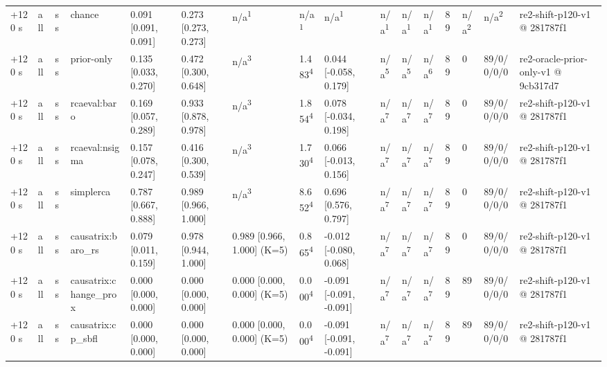\begin{table}[t]
\begin{tabular}{llllllllllllllll}
+120 s & all & ss & chance & 0.091 [0.091, 0.091] & 0.273 [0.273, 0.273] & n/a\textsuperscript{1} & n/a\textsuperscript{1} & n/a\textsuperscript{1} & n/a\textsuperscript{1} & n/a\textsuperscript{1} & n/a\textsuperscript{1} & 89 & n/a\textsuperscript{2} & n/a\textsuperscript{2} & re2-shift-p120-v1 @ 281787f1 \\
+120 s & all & ss & prior-only & 0.135 [0.033, 0.270] & 0.472 [0.300, 0.648] & n/a\textsuperscript{3} & 1.483\textsuperscript{4} & 0.044 [-0.058, 0.179] & n/a\textsuperscript{5} & n/a\textsuperscript{5} & n/a\textsuperscript{6} & 89 & 0 & 89/0/0/0/0 & re2-oracle-prior-only-v1 @ 9cb317d7 \\
+120 s & all & ss & rcaeval:baro & 0.169 [0.057, 0.289] & 0.933 [0.878, 0.978] & n/a\textsuperscript{3} & 1.854\textsuperscript{4} & 0.078 [-0.034, 0.198] & n/a\textsuperscript{7} & n/a\textsuperscript{7} & n/a\textsuperscript{7} & 89 & 0 & 89/0/0/0/0 & re2-shift-p120-v1 @ 281787f1 \\
+120 s & all & ss & rcaeval:nsigma & 0.157 [0.078, 0.247] & 0.416 [0.300, 0.539] & n/a\textsuperscript{3} & 1.730\textsuperscript{4} & 0.066 [-0.013, 0.156] & n/a\textsuperscript{7} & n/a\textsuperscript{7} & n/a\textsuperscript{7} & 89 & 0 & 89/0/0/0/0 & re2-shift-p120-v1 @ 281787f1 \\
+120 s & all & ss & simplerca & 0.787 [0.667, 0.888] & 0.989 [0.966, 1.000] & n/a\textsuperscript{3} & 8.652\textsuperscript{4} & 0.696 [0.576, 0.797] & n/a\textsuperscript{7} & n/a\textsuperscript{7} & n/a\textsuperscript{7} & 89 & 0 & 89/0/0/0/0 & re2-shift-p120-v1 @ 281787f1 \\
+120 s & all & ss & causatrix:baro\_rs & 0.079 [0.011, 0.159] & 0.978 [0.944, 1.000] & 0.989 [0.966, 1.000] (K=5) & 0.865\textsuperscript{4} & -0.012 [-0.080, 0.068] & n/a\textsuperscript{7} & n/a\textsuperscript{7} & n/a\textsuperscript{7} & 89 & 0 & 89/0/0/0/0 & re2-shift-p120-v1 @ 281787f1 \\
+120 s & all & ss & causatrix:change\_prox & 0.000 [0.000, 0.000] & 0.000 [0.000, 0.000] & 0.000 [0.000, 0.000] (K=5) & 0.000\textsuperscript{4} & -0.091 [-0.091, -0.091] & n/a\textsuperscript{7} & n/a\textsuperscript{7} & n/a\textsuperscript{7} & 89 & 89 & 89/0/0/0/0 & re2-shift-p120-v1 @ 281787f1 \\
+120 s & all & ss & causatrix:cp\_sbfl & 0.000 [0.000, 0.000] & 0.000 [0.000, 0.000] & 0.000 [0.000, 0.000] (K=5) & 0.000\textsuperscript{4} & -0.091 [-0.091, -0.091] & n/a\textsuperscript{7} & n/a\textsuperscript{7} & n/a\textsuperscript{7} & 89 & 89 & 89/0/0/0/0 & re2-shift-p120-v1 @ 281787f1 \\

\end{tabular}
\end{table}
